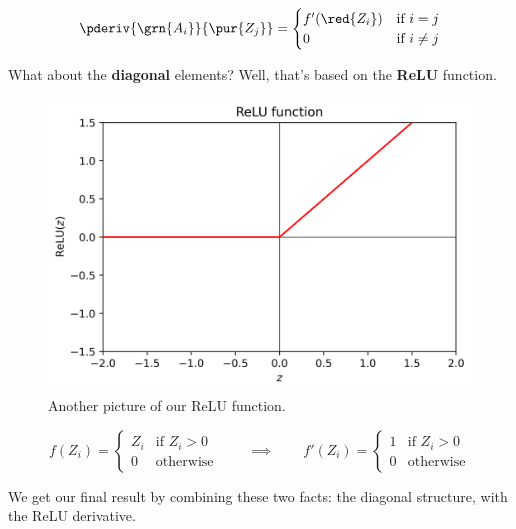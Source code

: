         \begin{equation}
            \pderiv { \grn{A_i} }{ \pur{Z_j} }
            = 
            \begin{cases}
              f'(\red{Z_i}) & \text{if } i = j\\
              0 & \text{if } i \neq j
            \end{cases}
        \end{equation}

        What about the \textbf{diagonal} elements? Well, that's based on the \textbf{ReLU} function.

        \begin{figure}[H]
            \centering
            \includegraphics[width=.3\textwidth]{images/nn_images/relu_fn.png}
            
            \caption*{Another picture of our ReLU function.}
        \end{figure}

        \begin{equation}
            f(Z_i) = \begin{cases}
                Z_i & \text{if } Z_i>0 \\
                0 & \text{otherwise}
            \end{cases}
            \qquad \implies \qquad
            f'(Z_i) = \begin{cases}
                1 & \text{if } Z_i>0 \\
                0 & \text{otherwise}
            \end{cases}
        \end{equation}

        We get our final result by combining these two facts: the diagonal structure, with the ReLU derivative.

